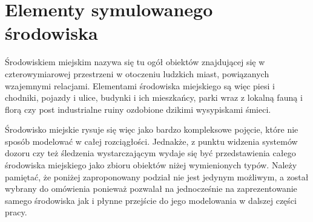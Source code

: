 {\section[Elementy symulowanego środowiska][Elementy symulowanego środowiska]{Elementy symulowanego środowiska}
\par{
Środowiskiem miejskim nazywa się tu ogół obiektów znajdującej się w czterowymiarowej przestrzeni w otoczeniu ludzkich miast, powiązanych wzajemnymi relacjami. Elementami środowiska miejskiego są więc piesi i chodniki, pojazdy i ulice, budynki i ich mieszkańcy, parki wraz z lokalną fauną i florą czy post industrialne ruiny ozdobione dzikimi wysypiskami śmieci.
}
\par{
Środowisko miejskie rysuje się więc jako bardzo kompleksowe pojęcie, które nie sposób modelować w całej rozciągłości. Jednakże, z punktu widzenia systemów dozoru czy też śledzenia wystarczającym wydaje się być przedstawienia całego środowiska miejskiego jako zbioru obiektów niżej wymienionych typów. Należy pamiętać, że poniżej zaproponowany podział nie jest jedynym możliwym, a został wybrany do omówienia ponieważ pozwalał na jednocześnie na zaprezentowanie samego środowiska jak i płynne przejście do jego modelowania w dalszej części pracy.
}
}
